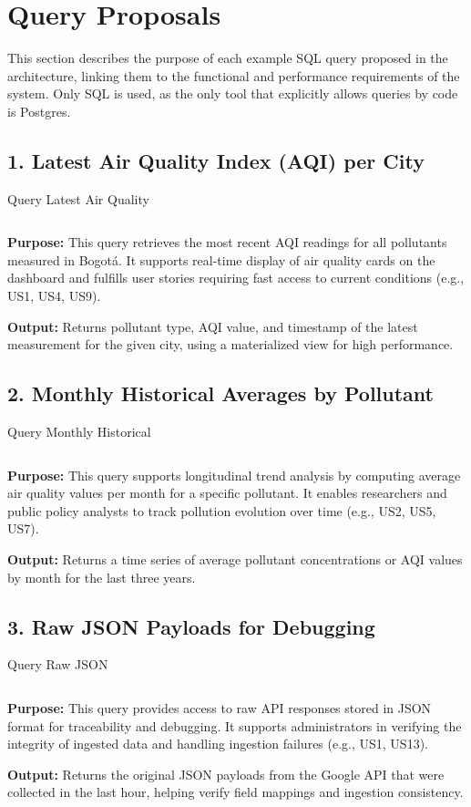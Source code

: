 \section{Query Proposals}
This section describes the purpose of each example SQL query proposed in the architecture, linking them to the functional and performance requirements of the system. Only SQL is used, as the only tool that explicitly allows queries by code is Postgres.
\subsection*{1. Latest Air Quality Index (AQI) per City}
\begin{listing}[H]
\caption{Query Latest Air Quality}
\label{code:query1}
\inputminted[linenos]{sql}{Codigos/query_1.tex}
\end{listing}

\textbf{Purpose:}  
This query retrieves the most recent AQI readings for all pollutants measured in Bogotá. It supports real-time display of air quality cards on the dashboard and fulfills user stories requiring fast access to current conditions (e.g., US1, US4, US9).

\textbf{Output:}  
Returns pollutant type, AQI value, and timestamp of the latest measurement for the given city, using a materialized view for high performance.

\subsection*{2. Monthly Historical Averages by Pollutant}
\begin{listing}[H]
\caption{Query Monthly Historical}
\label{code:query1}
\inputminted[linenos]{sql}{Codigos/query_2.tex}
\end{listing}

\textbf{Purpose:}  
This query supports longitudinal trend analysis by computing average air quality values per month for a specific pollutant. It enables researchers and public policy analysts to track pollution evolution over time (e.g., US2, US5, US7).

\textbf{Output:}  
Returns a time series of average pollutant concentrations or AQI values by month for the last three years.

\subsection*{3. Raw JSON Payloads for Debugging}
\begin{listing}[H]
\caption{Query Raw JSON}
\label{code:query1}
\inputminted[linenos]{sql}{Codigos/query_3.tex}
\end{listing}

\textbf{Purpose:}  
This query provides access to raw API responses stored in JSON format for traceability and debugging. It supports administrators in verifying the integrity of ingested data and handling ingestion failures (e.g., US1, US13).

\textbf{Output:}  
Returns the original JSON payloads from the Google API that were collected in the last hour, helping verify field mappings and ingestion consistency.

\newpage